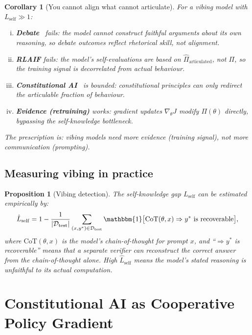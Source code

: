 \documentclass[11pt,a4paper]{article}
\newtheorem{proposition}[theorem]{Proposition}
\newtheorem{corollary}[theorem]{Corollary}
\newcommand{\cD}{\mathcal{D}}
\begin{document}
\begin{corollary}[You cannot align what cannot articulate]
\label{cor:cant-align}
For a vibing model with $L_{\mathrm{self}} \gg 1$:
\begin{enumerate}[(i)]
    \item \textbf{Debate}~\cite{irving2018} fails: the model cannot construct faithful arguments about its own reasoning, so debate outcomes reflect rhetorical skill, not alignment.
    \item \textbf{RLAIF} fails: the model's self-evaluations are based on $\hat{\Pi}_{\mathrm{articulated}}$, not $\Pi$, so the training signal is decorrelated from actual behaviour.
    \item \textbf{Constitutional AI}~\cite{bai2022} is bounded: constitutional principles can only redirect the articulable fraction of behaviour.
    \item \textbf{Evidence (retraining)} works: gradient updates $\nabla_\theta J$ modify $\Pi(\theta)$ directly, bypassing the self-knowledge bottleneck.
\end{enumerate}
The prescription is: vibing models need more \emph{evidence} (training signal), not more \emph{communication} (prompting).
\end{corollary}

\subsection{Measuring vibing in practice}

\begin{proposition}[Vibing detection]
\label{prop:vibing-detection}
The self-knowledge gap $L_{\mathrm{self}}$ can be estimated empirically by:
\begin{equation}
\label{eq:vibing-metric}
    \hat{L}_{\mathrm{self}} = 1 - \frac{1}{|\cD_{\mathrm{test}}|} \sum_{(x,y^*) \in \cD_{\mathrm{test}}} \mathbbm{1}\bigl[\mathrm{CoT}(\theta, x) \Rightarrow y^* \text{ is recoverable}\bigr],
\end{equation}
where $\mathrm{CoT}(\theta, x)$ is the model's chain-of-thought for prompt $x$, and ``$\Rightarrow y^*$ is recoverable'' means that a separate verifier can reconstruct the correct answer from the chain-of-thought alone. High $\hat{L}_{\mathrm{self}}$ means the model's stated reasoning is unfaithful to its actual computation.
\end{proposition}


\section{Constitutional AI as Cooperative Policy Gradient}
\label{sec:constitutional}
\end{document}
